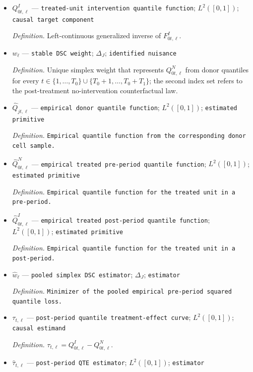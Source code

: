\documentclass{article}
\begin{document}
\begin{itemize}
  \item \(Q^I_{0t,\ell}\) --- \texttt{treated-\allowbreak{}unit intervention quantile function}; \(L^2([0,1])\); \texttt{causal target component}
  \par\smallskip\noindent\emph{Definition.} Left-continuous generalized inverse of \(F^I_{0t,\ell}\).
  \item \(w_\ell\) --- \texttt{stable DSC weight}; \(\Delta_J\); \texttt{identified nuisance}
  \par\smallskip\noindent\emph{Definition.} Unique simplex weight that represents \(Q^N_{0t,\ell}\) from donor quantiles for every \(t\in\{1,\ldots,T_0\}\cup\{T_0+1,\ldots,T_0+T_1\}\); the second index set refers to the post-treatment no-intervention counterfactual law.
  \item \(\widehat Q_{jt,\ell}\) --- \texttt{empirical donor quantile function}; \(L^2([0,1])\); \texttt{estimated primitive}
  \par\smallskip\noindent\emph{Definition.} \texttt{Empirical quantile function from the corresponding donor cell sample.}
  \item \(\widehat Q^N_{0t,\ell}\) --- \texttt{empirical treated pre-\allowbreak{}period quantile function}; \(L^2([0,1])\); \texttt{estimated primitive}
  \par\smallskip\noindent\emph{Definition.} \texttt{Empirical quantile function for the treated unit in a pre-\allowbreak{}period.}
  \item \(\widehat Q^I_{0t,\ell}\) --- \texttt{empirical treated post-\allowbreak{}period quantile function}; \(L^2([0,1])\); \texttt{estimated primitive}
  \par\smallskip\noindent\emph{Definition.} \texttt{Empirical quantile function for the treated unit in a post-\allowbreak{}period.}
  \item \(\widehat w_\ell\) --- \texttt{pooled simplex DSC estimator}; \(\Delta_J\); \texttt{estimator}
  \par\smallskip\noindent\emph{Definition.} \texttt{Minimizer of the pooled empirical pre-\allowbreak{}period squared quantile loss.}
  \item \(\tau_{t,\ell}\) --- \texttt{post-\allowbreak{}period quantile treatment-\allowbreak{}effect curve}; \(L^2([0,1])\); \texttt{causal estimand}
  \par\smallskip\noindent\emph{Definition.} \(\tau_{t,\ell}=Q^I_{0t,\ell}-Q^N_{0t,\ell}\).
  \item \(\widehat\tau_{t,\ell}\) --- \texttt{post-\allowbreak{}period QTE estimator}; \(L^2([0,1])\); \texttt{estimator}

\end{itemize}
\end{document}
